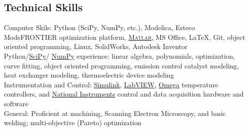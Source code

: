 \documentclass[centered]{res}
\begin{document}
\begin{resume}
\section{Technical Skills}
% 
Computer Skils: Python (SciPy, NumPy, etc.), Modelica, Esteco
ModeFRONTIER optimization platform,
\href{http://www.mathworks.com/products/matlab/}{\textsc{Matlab}}, MS
Office, \LaTeX, Git, object oriented programming, Linux, SolidWorks,
Autodesk Inventor
\vspace{5pt} \\
%
Python/\href{http://www.scipy.org/}{SciPy}/%
\href{http://numpy.scipy.org/}{NumPy}
experience: linear algebra, polynomials, optimization, curve fitting,
object oriented programming, emission control catalyst modeling, heat
exchanger modeling, thermoelectric device modeling
\vspace{5pt} \\
Instrumentation and Control:
\href{http://www.mathworks.com/products/simulink/}{Simulink},
\href{http://www.ni.com/}{LabVIEW},
\href{http://www.omega.com/}{Omega} temperature controllers, and
\href{http://www.ni.com}{National Instruments} control and data
acquisition hardware and software
\vspace{5pt} \\
General: Proficient at machining, Scanning Electron Microscopy, and
basic welding; multi-objective (Pareto) optimization
\vspace{5pt} \\
%

\end{resume}
\end{document}
